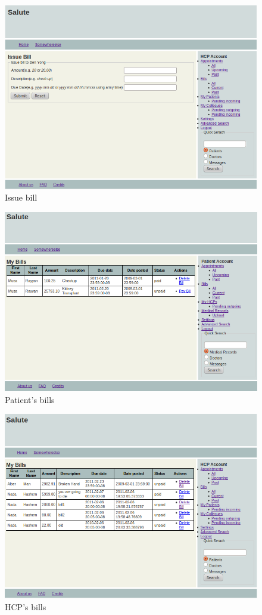 \begin{figure}
\includegraphics[scale=0.6]{screenshots/issuebill.png}
\caption{Issue bill}
\end{figure}

\begin{figure}
\includegraphics[scale=0.6]{screenshots/patient_bills.png}
\caption{Patient's bills}
\end{figure}

\begin{figure}
\includegraphics[scale=0.6]{screenshots/doc_bills.png}
\caption{HCP's bills}
\end{figure}

